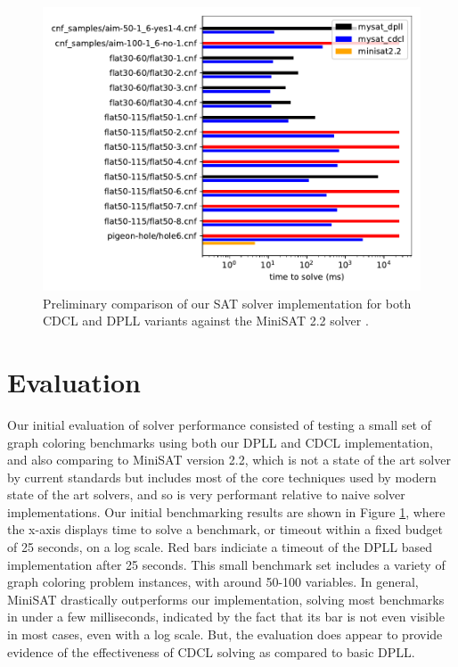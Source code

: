 \documentclass[12pt]{article}
\begin{document}
\begin{figure}
    \begin{center}
        \includegraphics[scale=0.6]{../results/compare.pdf}
    \end{center}
    \caption{Preliminary comparison of our SAT solver implementation for both CDCL and DPLL variants against the MiniSAT 2.2 solver \cite{minisat}. }
    \label{fig:benchmarks}
\end{figure}

\section{Evaluation}

Our initial evaluation of solver performance consisted of testing a small set of graph coloring benchmarks using both our DPLL and CDCL implementation, and also comparing to MiniSAT version 2.2, which is not a state of the art solver by current standards but includes most of the core techniques used by modern state of the art solvers, and so is very performant relative to naive solver implementations. Our initial benchmarking results are shown in Figure \ref{fig:benchmarks}, where the x-axis displays time to solve a benchmark, or timeout within a fixed budget of 25 seconds, on a log scale. Red bars indiciate a timeout of the DPLL based implementation after 25 seconds. This small benchmark set includes a variety of graph coloring problem instances, with around 50-100 variables. In general, MiniSAT drastically outperforms our implementation, solving most benchmarks in under a few milliseconds, indicated by the fact that its bar is not even visible in most cases, even with a log scale. But, the evaluation does appear to provide evidence of the effectiveness of CDCL solving as compared to basic DPLL.
\end{document}
